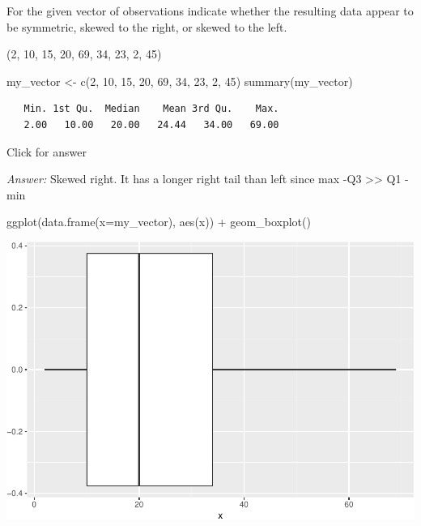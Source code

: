 \documentclass[
]{book}
\newenvironment{Shaded}{\begin{snugshade}}{\end{snugshade}}
\newcommand{\AttributeTok}[1]{\textcolor[rgb]{0.77,0.63,0.00}{#1}}
\newcommand{\DecValTok}[1]{\textcolor[rgb]{0.00,0.00,0.81}{#1}}
\newcommand{\FunctionTok}[1]{\textcolor[rgb]{0.00,0.00,0.00}{#1}}
\newcommand{\NormalTok}[1]{#1}
\newcommand{\OtherTok}[1]{\textcolor[rgb]{0.56,0.35,0.01}{#1}}
\newcommand{\SpecialCharTok}[1]{\textcolor[rgb]{0.00,0.00,0.00}{#1}}
\begin{document}
For the given vector of observations indicate whether the resulting data appear to be symmetric, skewed to the right, or skewed to the left.

(2, 10, 15, 20, 69, 34, 23, 2, 45)

\begin{Shaded}
\begin{Highlighting}[]
\NormalTok{my\_vector }\OtherTok{\textless{}{-}} \FunctionTok{c}\NormalTok{(}\DecValTok{2}\NormalTok{, }\DecValTok{10}\NormalTok{, }\DecValTok{15}\NormalTok{, }\DecValTok{20}\NormalTok{, }\DecValTok{69}\NormalTok{, }\DecValTok{34}\NormalTok{, }\DecValTok{23}\NormalTok{, }\DecValTok{2}\NormalTok{, }\DecValTok{45}\NormalTok{)}
\FunctionTok{summary}\NormalTok{(my\_vector)}
\end{Highlighting}
\end{Shaded}

\begin{verbatim}
   Min. 1st Qu.  Median    Mean 3rd Qu.    Max. 
   2.00   10.00   20.00   24.44   34.00   69.00 
\end{verbatim}

Click for answer

\emph{Answer:} Skewed right. It has a longer right tail than left since max -Q3 \textgreater\textgreater{} Q1 - min

\begin{Shaded}
\begin{Highlighting}[]
\FunctionTok{ggplot}\NormalTok{(}\FunctionTok{data.frame}\NormalTok{(}\AttributeTok{x=}\NormalTok{my\_vector), }\FunctionTok{aes}\NormalTok{(x)) }\SpecialCharTok{+} \FunctionTok{geom\_boxplot}\NormalTok{()}
\end{Highlighting}
\end{Shaded}

\includegraphics[width=1\linewidth]{Class_Activity_5_files/figure-latex/unnamed-chunk-7-1}
\end{document}
